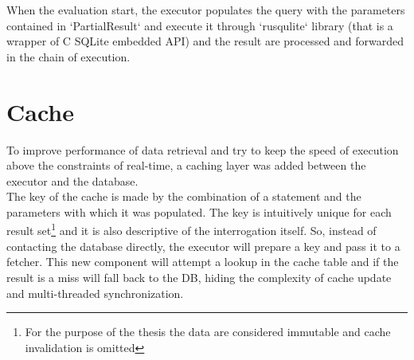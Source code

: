 When the evaluation start, the executor populates the query with the parameters contained in `PartialResult` and execute it through `rusqulite` library (that is a wrapper of C SQLite embedded API) and the result are processed and forwarded in the chain of execution.

\section{Cache}
To improve performance of data retrieval and try to keep the speed of execution above the constraints of real-time, a caching layer was added between the executor and the database.\\
The key of the cache is made by the combination of a statement and the parameters with which it was populated. The key is intuitively unique for each result set\footnote{For the purpose of the thesis the data are considered immutable and cache invalidation is omitted} and it is also descriptive of the interrogation itself. So, instead of contacting the database directly, the executor will prepare a key and pass it to a fetcher. This new component will attempt a lookup in the cache table and if the result is a miss will fall back to the DB, hiding the complexity of cache update and multi-threaded synchronization.

